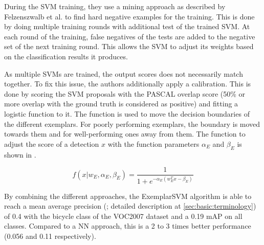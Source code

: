 During the \ac{SVM} training, they use a mining approach as described by Felzenszwalb et al. \cite{felzenszwalb2010object} to find hard negative examples for the training. This is done by doing multiple training rounds with additional test of the trained \ac{SVM}. At each round of the training, false negatives of the tests are added to the negative set of the next training round. This allows the \ac{SVM} to adjust its weights based on the classification results it produces.

As multiple \acp{SVM} are trained, the output scores does not necessarily match together. To fix this issue, the authors additionally apply a calibration. This is done by scoring the \ac{SVM} proposals with the PASCAL overlap score (50\% or more overlap with the ground truth is considered as positive) and fitting a logistic function to it. The function is used to move the decision boundaries of the different exemplars. For poorly performing exemplars, the boundary is moved towards them and for well-performing ones away from them. The function to adjust the score of a detection $x$ with the function parameters $\alpha_E$ and $\beta_E$ is shown in .

\begin{equation}
f(x|w_E, \alpha_E, \beta_E) = \frac{1}{1 + e^{-\alpha_E (w^T_E x - \beta_E)} }
\label{eqn:esvm:calibration}
\end{equation}

By combining the different approaches, the ExemplarSVM algorithm is able to reach a mean average precision (; detailed description at \ref{sec:basic:terminology}) of 0.4 with the bicycle class of the \ac{VOC2007} dataset \cite{Pascal2007} and a 0.19 \ac{mAP} on all classes. Compared to a \ac{NN} approach, this is a 2 to 3 times better performance (0.056 and 0.11 respectively).